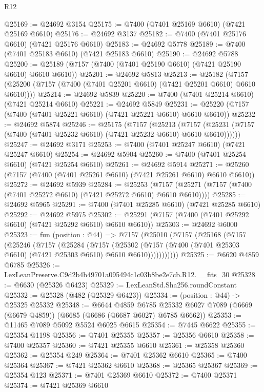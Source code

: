 \begin{lexlean}{R12}
\begin{coremodule}
@25169 := @24692 @3154
@25175 := @7400 (@7401 @25169 @6610) (@7421 @25169 @6610)
@25176 := @24692 @3137
@25182 := @7400 (@7401 @25176 @6610) (@7421 @25176 @6610)
@25183 := @24692 @5778
@25189 := @7400 (@7401 @25183 @6610) (@7421 @25183 @6610)
@25190 := @24692 @5788
@25200 := @25189 (@7157 (@7400 (@7401 @25190 @6610) (@7421 @25190 @6610) @6610 @6610))
@25201 := @24692 @5813
@25213 := @25182
    (@7157 (@25200 (@7157 (@7400 (@7401 @25201 @6610) (@7421 @25201 @6610) @6610 @6610))))
@25214 := @24692 @5839
@25220 := @7400 (@7401 @25214 @6610) (@7421 @25214 @6610)
@25221 := @24692 @5849
@25231 := @25220 (@7157 (@7400 (@7401 @25221 @6610) (@7421 @25221 @6610) @6610 @6610))
@25232 := @24692 @5874
@25246 := @25175
    (@7157
      (@25213
        (@7157 (@25231 (@7157 (@7400 (@7401 @25232 @6610) (@7421 @25232 @6610) @6610 @6610))))))
@25247 := @24692 @3171
@25253 := @7400 (@7401 @25247 @6610) (@7421 @25247 @6610)
@25254 := @24692 @5904
@25260 := @7400 (@7401 @25254 @6610) (@7421 @25254 @6610)
@25261 := @24692 @5914
@25271 := @25260 (@7157 (@7400 (@7401 @25261 @6610) (@7421 @25261 @6610) @6610 @6610))
@25272 := @24692 @5939
@25284 := @25253
    (@7157 (@25271 (@7157 (@7400 (@7401 @25272 @6610) (@7421 @25272 @6610) @6610 @6610))))
@25285 := @24692 @5965
@25291 := @7400 (@7401 @25285 @6610) (@7421 @25285 @6610)
@25292 := @24692 @5975
@25302 := @25291 (@7157 (@7400 (@7401 @25292 @6610) (@7421 @25292 @6610) @6610 @6610))
@25303 := @24692 @6000
@25323 := fun (position : @44) =>
  @7157
    (@25010
      (@7157
        (@25168
          (@7157
            (@25246
              (@7157
                (@25284
                  (@7157
                    (@25302
                      (@7157 (@7400 (@7401 @25303 @6610) (@7421 @25303 @6610) @6610 @6610)))))))))))
@25325 := @6620 @4859 @6785
@25326 := LexLeanPreserve.C9d2b4b49701a095494c1c03b8be2e7cb.R12.__fits_30
@25328 := @6630 (@25326 @6423)
@25329 := LexLeanStd.Sha256.roundConstant
@25332 := @25328 (@482 (@25329 @6423))
@25334 := (position : @44) -> @25325 @25332
@25348 := @6644
    @4859
    @6785
    @25332
    @6027
    @7089
    (@6669 (@6679 @4859))
    (@6685 (@6686 (@6687 @6027) @6785 @6662))
@25353 := @11465 @7089 @5092 @5524 @6025 @6615
@25354 := @7445 @6622
@25355 := @25354 @1198
@25356 := @7401 @25355
@25357 := @25356 @6610
@25358 := @7400 @25357
@25360 := @7421 @25355 @6610
@25361 := @25358 @25360
@25362 := @25354 @249
@25364 := @7401 @25362 @6610
@25365 := @7400 @25364
@25367 := @7421 @25362 @6610
@25368 := @25365 @25367
@25369 := @25354 @123
@25371 := @7401 @25369 @6610
@25372 := @7400 @25371
@25374 := @7421 @25369 @6610

\end{coremodule}
\end{lexlean}
